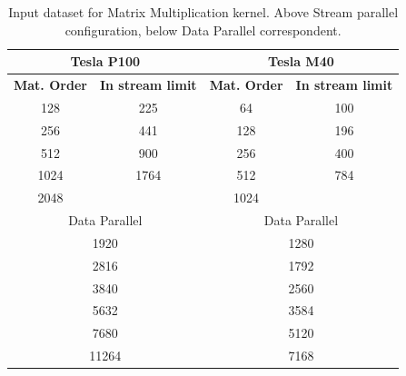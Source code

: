 	\begin{table}	
		\centering
		\begin{tabular}{| c | c | c | c |} 
			\hline
			
			 \multicolumn{2}{c}{\textbf{Tesla P100}} & \multicolumn{2}{c}{\textbf{Tesla M40}} \\ [0.5ex]
			\hline\hline
			
			\textbf{Mat. Order} & \textbf{In stream limit} & \textbf{Mat. Order} & \textbf{In stream limit}  \\ 
			\hline
			128 & 225 & 64 & 100  \\ 
			\hline	
			256 & 441 & 128 & 196  \\ 
			\hline	
			512 & 900 & 256 & 400  \\ 
			\hline		
			1024 & 1764 & 512 & 784  \\ 
			\hline			
			2048 &  & 1024 &  \\
			\hline
			\hline				
			
			\multicolumn{2}{c}{Data Parallel} &  \multicolumn{2}{c}{Data Parallel} \\ [0.5ex]
			\hline\hline
			\multicolumn{2}{c}{1920} & \multicolumn{2}{c}{1280} \\ [0.5ex]
			\hline			
			\multicolumn{2}{c}{2816} & \multicolumn{2}{c}{1792} \\ [0.5ex]
			\hline
			\multicolumn{2}{c}{3840} & \multicolumn{2}{c}{2560} \\ [0.5ex]
			\hline
			\multicolumn{2}{c}{5632} & \multicolumn{2}{c}{3584} \\ [0.5ex]
			\hline
			\multicolumn{2}{c}{7680} & \multicolumn{2}{c}{5120} \\ [0.5ex]
			\hline
			\multicolumn{2}{c}{11264} & \multicolumn{2}{c}{7168} \\ [0.5ex]
			\hline

		\end{tabular}
		\caption{Input dataset for Matrix Multiplication kernel. Above Stream parallel configuration, below Data Parallel correspondent.}	
		\label{tab:matdata}		
	\end{table}
	
